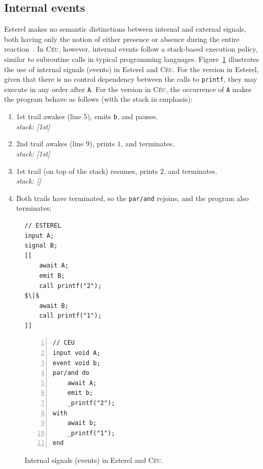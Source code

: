\documentclass{acm_proc_article-sp}
\newcommand{\CEU}{\textsc{C\'{e}u}\xspace}
\newcommand{\code}[1] {{\small{\texttt{#1}}}}
\newcommand{\1}{\;}
\newcommand{\2}{\;\;}
\newcommand{\3}{\;\;\;}
\newcommand{\5}{\;\;\;\;\;}
\begin{document}
\subsection{Internal events}
\label{sec.ceu.ints}

Esterel makes no semantic distinctions between internal and external signals, 
both having only the notion of either presence or absence during the entire 
reaction~\cite{esterel.preemption}.
%
In \CEU, however, internal events follow a stack-based execution policy, 
similar to subroutine calls in typical programming languages.
%
Figure~\ref{lst.prints} illustrates the use of internal signals (events) in 
Esterel and \CEU.
%
For the version in Esterel, given that there is no control dependency between 
the calls to \code{printf}, they may execute in any order after \code{A}.
%
For the version in \CEU, the occurrence of \code{A} makes the program behave as 
follows (with the stack in emphasis):
%
{\small
\begin{enumerate}
\setlength{\itemsep}{0pt}
\item 1st trail awakes (line 5), emits \code{b}, and pauses.\\
    \emph{stack: [1st]}
\item 2nd trail awakes (line 9), prints $1$, and terminates.\\
    \emph{stack: [1st]}
\item 1st trail (on top of the stack) resumes, prints $2$, and terminates.\\
    \emph{stack: []}
\item Both trails have terminated, so the \code{par/and} rejoins, and the 
program also terminates;
\end{enumerate}
}

\begin{figure}[!t]
\begin{minipage}[t]{0.49\linewidth}
\begin{lstlisting}[mathescape=true]
// ESTEREL
input A;
signal B;
[[
    await A;
    emit B;
    call printf("2");
$\|$
    await B;
    call printf("1");
]]
\end{lstlisting}
\end{minipage}
%
\begin{minipage}[t]{0.50\linewidth}
\begin{lstlisting}[numbers=left,xleftmargin=3em]
// CEU
input void A;
event void b;
par/and do
    await A;
    emit b;
    _printf("2");
with
    await b;
    _printf("1");
end
\end{lstlisting}
\end{minipage}
\caption{ Internal signals (events) in Esterel and \CEU. \newline
\label{lst.prints}
}
\end{figure}
\end{document}
